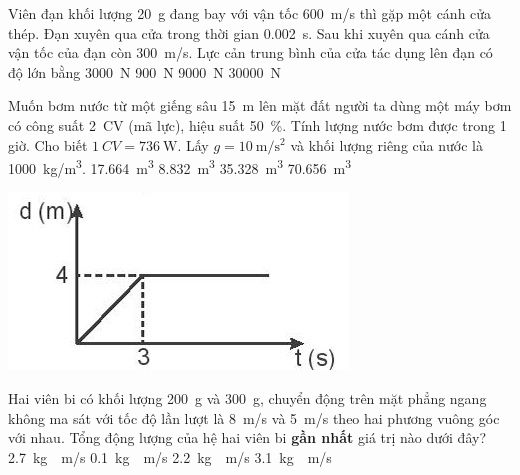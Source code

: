 \begin{ex}
	Viên đạn khối lượng \SI{20}{\gram} đang bay với vận tốc \SI{600}{\meter/\second} thì gặp một cánh cửa thép. Đạn xuyên qua cửa trong thời gian \SI{0.002}{\second}. Sau khi xuyên qua cánh cửa vận tốc của đạn còn \SI{300}{\meter/\second}. Lực cản trung bình của cửa tác dụng lên đạn có độ lớn bằng
	\choice
	{\True \SI{3000}{\newton}}
	{\SI{900}{\newton}}
	{\SI{9000}{\newton}}
	{\SI{30000}{\newton}}
	\loigiai{}
\end{ex}
\begin{ex}
	Muốn bơm nước từ một giếng sâu \SI{15}{\meter} lên mặt đất người ta dùng một máy bơm có công suất \SI{2}{CV} (mã lực), hiệu suất \SI{50}{\percent}. Tính lượng nước bơm được trong 1 giờ. Cho biết $\SI{1}{CV}=\SI{736}{\watt}$. Lấy $g=\SI{10}{\meter/\second^2}$ và khối lượng riêng của nước là \SI{1000}{\kilogram/\meter^3}.
	\choice
	{\True \SI{17.664}{\meter^3}}
	{\SI{8.832}{\meter^3}}
	{\SI{35.328}{\meter^3}}
	{\SI{70.656}{\meter^3}}
	\loigiai{}
\end{ex}
\begin{ex}
	
	{\includegraphics[scale=0.5]{../figs/D10-CK2-001-2}}
	\loigiai{}
\end{ex}
\begin{ex}
	Hai viên bi có khối lượng \SI{200}{\gram} và \SI{300}{\gram}, chuyển động trên mặt phẳng ngang không ma sát với tốc độ lần lượt là \SI{8}{\meter/\second}  và \SI{5}{\meter/\second} theo hai phương vuông góc với nhau. Tổng động lượng của hệ hai viên bi \textbf{gần nhất} giá trị nào dưới đây?
	\choice
	{\SI{2.7}{\kilogram\cdot\meter/\second}}
	{\SI{0.1}{\kilogram\cdot\meter/\second}}
	{\True \SI{2.2}{\kilogram\cdot\meter/\second}}
	{\SI{3.1}{\kilogram\cdot\meter/\second}}
	\loigiai{}
\end{ex}
